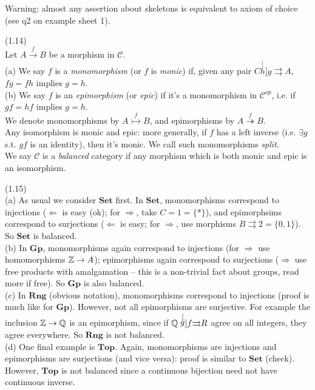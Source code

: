 \documentclass[a4paper]{article}
\begin{document}
Warning: almost any assertion about skeletons is equivalent to axiom of choice (see q2 on example sheet 1).

\begin{defi} (1.14)\\
    Let $A \xrightarrow{f} B$ be a morphism in $\mathcal{C}$.\\
    (a) We say $f$ is a \emph{monomorphism} (or $f$ is \emph{monic}) if, given any pair $C \stackrel[h]{g}{\rightrightarrows} A$, $fg=fh$ implies $g=h$.\\
    (b) We say $f$ is an \emph{epimorphism} (or \emph{epic}) if it's a monomorphism in $\mathcal{C}^{op}$, i.e. if $gf = hf$ implies $g=h$.\\
    We denote monomorphisms by $A \stackrel{f}{\rightarrowtail} B$, and epimorphisms by $A \stackrel{f}{\twoheadrightarrow} B$.\\
    Any isomorphism is monic and epic: more generally, if $f$ has a left inverse (i.e. $\exists g$ s.t. $gf$ is an identity), then it's monic. We call such monomorphisms \emph{split}.\\
    We say $\mathcal{C}$ is a \emph{balanced} category if any morphism which is both monic and epic is an isomorphism.
\end{defi}

\begin{eg} (1.15)\\
    (a) As usual we consider $\mathbf{Set}$ first. In $\mathbf{Set}$, monomorphisms correspond to injections ($\Leftarrow$ is easy (ok); for $\Rightarrow$, take $C = 1 = \{*\}$), and epimorphsims correspond to surjections ($\Leftarrow$ is easy; for $\Rightarrow$, use morphisms $B \rightrightarrows 2 = \{0,1\}$). So $\mathbf{Set}$ is balanced.\\
    (b) In $\mathbf{Gp}$, monomorphisms again correspond to injections (for $\Rightarrow$ use homomorphisms $\mathbb{Z} \to A$); epimorphisms again correspond to surjections ($\Rightarrow$ use free products with amalgamation -- this is a non-trivial fact about groups, read more if free). So $\mathbf{Gp}$ is also balanced.\\
    (c) In $\mathbf{Rng}$ (obvious notation), monomorphisms correspond to injections (proof is much like for $\mathbf{Gp}$). However, not all epimorphisms are surjective. For example the inclusion $\mathbb{Z} \to \mathbb{Q}$ is an epimorphism, since if $\mathbb{Q} \stackrel[g]{f}{\rightrightarrows} R$ agree on all integers, they agree everywhere. So $\mathbf{Rng}$ is not balanced.\\
    (d) One final example is $\mathbf{Top}$. Again, monomorphisms are injections and epimorphisms are surjections (and vice versa): proof is similar to $\mathbf{Set}$ (check). However, $\mathbf{Top}$ is not balanced since a continuous bijection need not have continuous inverse.
\end{eg}
\end{document}
